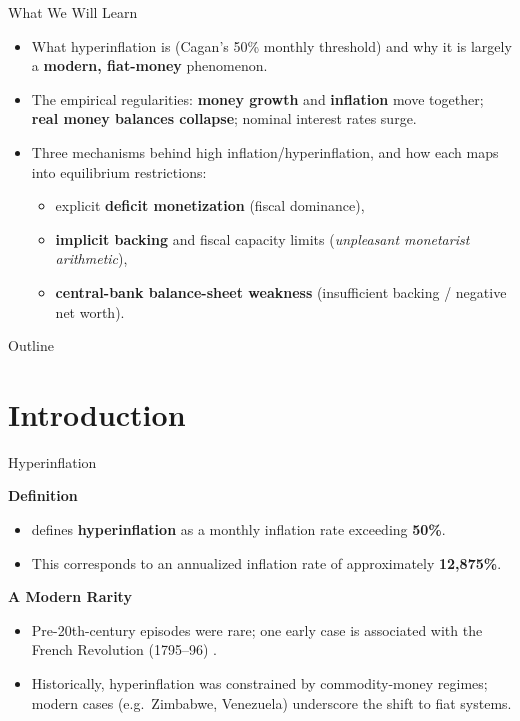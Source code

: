 \documentclass[11pt,aspectratio=169]{beamer}
\begin{document}
\begin{frame}{What We Will Learn}
\small
\begin{itemize}
  \item What hyperinflation is (Cagan’s 50\% monthly threshold) and why it is largely a \textbf{modern, fiat-money} phenomenon.
  \item The empirical regularities: \textbf{money growth} and \textbf{inflation} move together; \textbf{real money balances collapse}; nominal interest rates surge.
  
  \item Three mechanisms behind high inflation/hyperinflation, and how each maps into equilibrium restrictions:
  \begin{itemize}
    \item explicit \textbf{deficit monetization} (fiscal dominance),
    \item \textbf{implicit backing} and fiscal capacity limits (\emph{unpleasant monetarist arithmetic}),
    \item \textbf{central-bank balance-sheet weakness} (insufficient backing / negative net worth).
  \end{itemize}
  
\end{itemize}
\end{frame}


\begin{frame}{Outline}
\tableofcontents
\end{frame}

\section{Introduction}

\begin{frame}{Hyperinflation}
\small

\textbf{Definition}
\begin{itemize}
    \item \textcite{cagan1956} defines \textbf{hyperinflation} as a monthly inflation rate exceeding \textbf{50\%}.
    \item This corresponds to an annualized inflation rate of approximately \textbf{12{,}875\%}.
\end{itemize}

\vspace{0.3cm}

\textbf{A Modern Rarity}
\begin{itemize}
    \item Pre-20th-century episodes were rare; one early case is associated with the French Revolution (1795--96) \parencite{capie1991}.
    \item Historically, hyperinflation was constrained by commodity-money regimes; modern cases (e.g.\ Zimbabwe, Venezuela) underscore the shift to fiat systems.
\end{itemize}
\end{frame}
\end{document}
